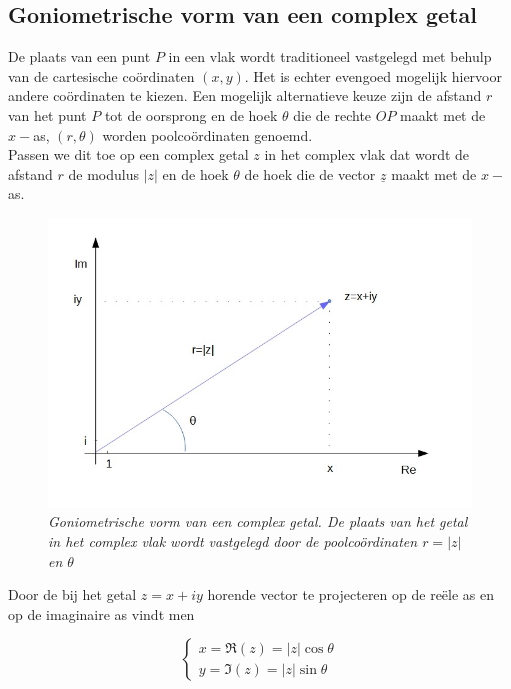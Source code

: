 \subsection{Goniometrische vorm van een complex getal}

De plaats van een punt $P$ in een vlak wordt traditioneel vastgelegd met behulp van de cartesische co\"{o}rdinaten $(x,y)$. Het is echter evengoed mogelijk hiervoor andere co\"{o}rdinaten te kiezen. Een mogelijk alternatieve keuze zijn de afstand $r$ van het punt $P$ tot de oorsprong en de hoek $\theta$ die de rechte $OP$ maakt met de $x-$as, $(r,\theta)$ worden poolco\"{o}rdinaten genoemd.\\
Passen we dit toe op een complex getal $z$ in het complex vlak dat wordt de afstand $r$ de modulus $|z|$ en de hoek $\theta$ de hoek die de vector $\underline{z}$ maakt met de $x-$as.\\

\begin{figure}[h]
	\begin{center}
		\includegraphics[scale=0.6]{3_gonio_complexe_getallen/inputs/complex-getal-5-goniometrisch.jpg}
	\end{center}
	\caption{\it Goniometrische vorm van een complex getal. De plaats van het getal in het complex vlak wordt vastgelegd door de poolco\"{o}rdinaten $r=|z|$ en $\theta$}
\end{figure}

Door de bij het getal $z=x+iy$ horende vector te projecteren op de re\"{e}le as en op de imaginaire as vindt men

\[ \left\{ \begin{array}{l}
x=\Re(z)=|z|\cos \theta  \\ y=\Im(z)=|z|\sin \theta
\end{array} \right. \]

